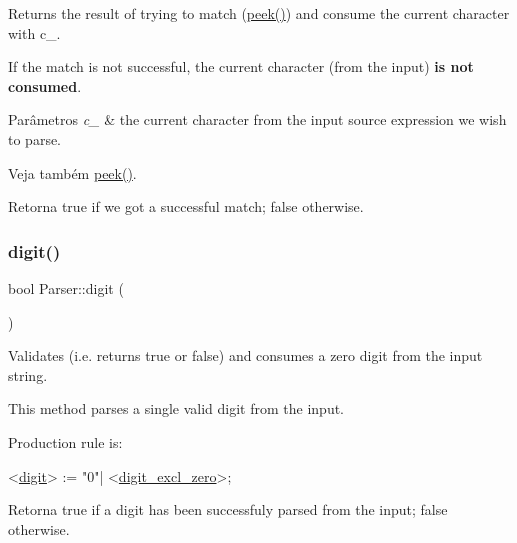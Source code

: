 Returns the result of trying to match (\hyperlink{classParser_a38df5f6fc75d85cc6907ae21e11c5b16}{peek()}) and consume the current character with c\+\_\+. 

If the match is not successful, the current character (from the input) {\bfseries is not consumed}. 
\begin{DoxyParams}{Parâmetros}
{\em c\+\_\+} & the current character from the input source expression we wish to parse. \\
\hline
\end{DoxyParams}
\begin{DoxySeeAlso}{Veja também}
\hyperlink{classParser_a38df5f6fc75d85cc6907ae21e11c5b16}{peek()}. 
\end{DoxySeeAlso}
\begin{DoxyReturn}{Retorna}
true if we got a successful match; false otherwise. 
\end{DoxyReturn}
\mbox{\label{classParser_ad9b268411777d28893f547653ece2206}} 
\subsubsection{\texorpdfstring{digit()}{digit()}}
{\footnotesize\ttfamily bool Parser\+::digit (\begin{DoxyParamCaption}{ }\end{DoxyParamCaption})\hspace{0.3cm}{\ttfamily [private]}}



Validates (i.\+e. returns true or false) and consumes a zero digit from the input string. 

This method parses a single valid digit from the input.

Production rule is\+: 
\begin{DoxyCode}
<\hyperlink{classParser_ad9b268411777d28893f547653ece2206}{digit}> := \textcolor{stringliteral}{"0"}| <\hyperlink{classParser_ac1522aacdb7de926636be0ca1067b915}{digit\_excl\_zero}>;
\end{DoxyCode}


\begin{DoxyReturn}{Retorna}
true if a digit has been successfuly parsed from the input; false otherwise. 
\end{DoxyReturn}
\mbox{\label{classParser_ac1522aacdb7de926636be0ca1067b915}} 
